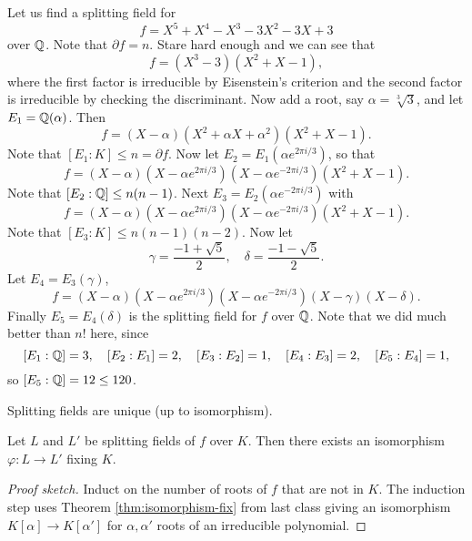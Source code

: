 \begin{example}
  Let us find a splitting field for
  \[f = X^5 + X^4 - X^3 - 3X^2 - 3X + 3\]
  over $\mathbb{Q}$. Note that $\partial f = n$.
  Stare hard enough and we can see that
  \[
    f = (X^3 - 3)(X^2 + X - 1),
  \]
  where the first factor is irreducible by Eisenstein's criterion and
  the second factor is irreducible by checking the
  discriminant. Now add a root, say $\alpha = \sqrt[3]{3}$,
  and let $E_1 = \mathbb{Q}(\alpha)$. Then
  \[
    f = (X - \alpha) (X^2 + \alpha X + \alpha^2)(X^2 + X - 1).
  \]
  Note that $[E_1 : K] \le n = \partial f$.
  Now let $E_2 = E_1(\alpha e^{2\pi i / 3})$, so that
  \[
    f = (X - \alpha) (X - \alpha e^{2\pi i / 3})
    (X - \alpha e^{-2\pi i / 3})(X^2 + X - 1).
  \]
  Note that $[E_2 : \mathbb{Q}] \le n(n - 1)$. Next
  $E_3 = E_2(\alpha e^{- 2\pi i / 3})$ with
  \[
    f = (X - \alpha) (X - \alpha e^{2\pi i / 3})
    (X - \alpha e^{-2\pi i / 3})(X^2 + X - 1).
  \]
  Note that $[E_3 : K] \le n(n - 1)(n - 2)$. Now let
  \[
    \gamma = \frac{-1 + \sqrt{5}}{2}, \quad \delta = \frac{-1 - \sqrt{5}}{2}.
  \]
  Let $E_4 = E_3(\gamma)$,
  \[
    f = (X - \alpha) (X - \alpha e^{2\pi i / 3})
    (X - \alpha e^{-2\pi i / 3})(X - \gamma)(X - \delta).
  \]
  Finally $E_5 = E_4(\delta)$ is the splitting field
  for $f$ over $\mathbb{Q}$. Note that we did much better than
  $n!$ here, since
  \[
    [E_1 : \mathbb{Q}] = 3, \quad [E_2 : E_1] = 2, \quad
    [E_3 : E_2] = 1, \quad [E_4 : E_3] = 2, \quad
    [E_5 : E_4] = 1,
  \]
  so $[E_5 : \mathbb{Q}] = 12 \le 120$.
\end{example}

\begin{remark}
  Splitting fields are unique (up to isomorphism).
\end{remark}

\begin{theorem}
  Let $L$ and $L'$ be splitting fields of $f$ over $K$.
  Then there exists an isomorphism
  $\varphi : L \to L'$ fixing $K$.
\end{theorem}

\begin{proof}[Proof sketch]
  Induct on the number of roots of $f$ that are not
  in $K$. The induction step uses Theorem \ref{thm:isomorphism-fix}
  from last
  class giving an isomorphism $K[\alpha] \to K[\alpha']$
  for $\alpha, \alpha'$ roots of an irreducible
  polynomial.
\end{proof}

